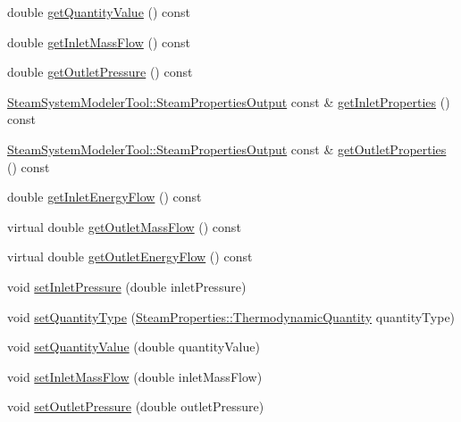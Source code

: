 \begin{DoxyCompactItemize}
\item 
double \hyperlink{class_prv_without_desuperheating_a1113c254f45d08588b0afe4bd1273530}{get\+Quantity\+Value} () const
\item 
double \hyperlink{class_prv_without_desuperheating_a0ae2ed88cc8bd4e69cddc05ef1225811}{get\+Inlet\+Mass\+Flow} () const
\item 
double \hyperlink{class_prv_without_desuperheating_ae1d335703442deec2f2c2f93e4c862f2}{get\+Outlet\+Pressure} () const
\item 
\hyperlink{struct_steam_system_modeler_tool_1_1_steam_properties_output}{Steam\+System\+Modeler\+Tool\+::\+Steam\+Properties\+Output} const  \& \hyperlink{class_prv_without_desuperheating_aefb61f9d9dd99216459f6948308d11e9}{get\+Inlet\+Properties} () const
\item 
\hyperlink{struct_steam_system_modeler_tool_1_1_steam_properties_output}{Steam\+System\+Modeler\+Tool\+::\+Steam\+Properties\+Output} const  \& \hyperlink{class_prv_without_desuperheating_afcf1f5d7e6b18643ac8adc9023578147}{get\+Outlet\+Properties} () const
\item 
double \hyperlink{class_prv_without_desuperheating_a040dbe6a11a722f15450cd00ac454c48}{get\+Inlet\+Energy\+Flow} () const
\item 
virtual double \hyperlink{class_prv_without_desuperheating_aefe4227f2c01209ba4ce79f6b5825d73}{get\+Outlet\+Mass\+Flow} () const
\item 
virtual double \hyperlink{class_prv_without_desuperheating_a6529a68ffa444ae87c890b2bcbc2cc84}{get\+Outlet\+Energy\+Flow} () const
\item 
void \hyperlink{class_prv_without_desuperheating_a26039a0a228ca66f96e8402bf741b9d9}{set\+Inlet\+Pressure} (double inlet\+Pressure)
\item 
void \hyperlink{class_prv_without_desuperheating_a212177b7a16c7452358df4120196c04b}{set\+Quantity\+Type} (\hyperlink{class_steam_properties_ae0294bedf7d178c2d8fb6aed0f62fbff}{Steam\+Properties\+::\+Thermodynamic\+Quantity} quantity\+Type)
\item 
void \hyperlink{class_prv_without_desuperheating_a5ed2d0f0f558705d482ed0502131757f}{set\+Quantity\+Value} (double quantity\+Value)
\item 
void \hyperlink{class_prv_without_desuperheating_abeccff2dc91144452b34ca343ee63fa7}{set\+Inlet\+Mass\+Flow} (double inlet\+Mass\+Flow)
\item 
void \hyperlink{class_prv_without_desuperheating_a0f2a4597b58390e5c4a7c75b38bbebbc}{set\+Outlet\+Pressure} (double outlet\+Pressure)
\end{DoxyCompactItemize}
